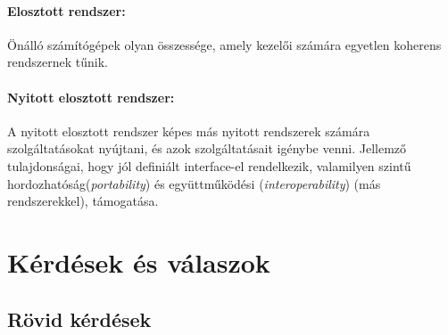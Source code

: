 \documentclass[12pt]{article}
\begin{document}
    \paragraph{Elosztott rendszer:}
    Önálló számítógépek olyan összessége, amely kezelői számára egyetlen
    koherens rendszernek tűnik.
    \paragraph{Nyitott elosztott rendszer:}
    A nyitott elosztott rendszer képes más nyitott rendszerek számára
    szolgáltatásokat nyújtani, és azok szolgáltatásait igénybe venni.
    Jellemző tulajdonságai, hogy jól definiált interface-el rendelkezik,
    valamilyen szintű hordozhatóság(\textit{portability}) és
    együttműködési (\textit{interoperability}) (más
    rendszerekkel), támogatása. 
    \section{Kérdések és válaszok}
    \subsection{Rövid kérdések}
\end{document}
